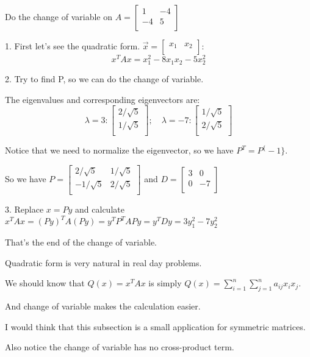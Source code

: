 \begin{eg}
    Do the change of variable on \(A = \begin{bmatrix}
        1 &  -4 \\
        -4 &  5 \\
    \end{bmatrix}\) 

    1. First let's see the quadratic form. \(\vec{x} = \begin{bmatrix}
        x_1 &  x_2 \\
    \end{bmatrix}\): 
    \[
        x^TAx = x_1^2 - 8x_1x_2 - 5x_2^2
    \]

    2. Try to find P, so we can do the change of variable.

    The eigenvalues and corresponding eigenvectors are:
    \[
        \lambda = 3: \begin{bmatrix}
             2/\sqrt{5} \\
             1/\sqrt{5} \\
        \end{bmatrix};
        \quad
        \lambda = -7: \begin{bmatrix}
             1/\sqrt{5} \\
             2/\sqrt{5} \\
        \end{bmatrix}
    \]

    \begin{remark}
    Notice that we need to normalize the eigenvector, so we have \(P^T = P^\{ -1 \} \).
    \end{remark}

    So we have \(P = \begin{bmatrix}
        2/\sqrt{5} &  1/\sqrt{5} \\
        -1/\sqrt{5} &  2/\sqrt{5} \\
    \end{bmatrix}\)
    and  \(D = \begin{bmatrix}
        3 &  0 \\
        0 &  -7 \\
    \end{bmatrix}\) 

    3. Replace \(x = Py\) and calculate \(x^TAx = (Py)^TA(Py) = y^TP^TAPy = y^TDy = 3y_1^2 - 7 y_2^2\)   

    That's the end of the change of variable.
\end{eg}

\begin{note}
    Quadratic form is very natural in real day problems. 

    We should know that \(Q(x) = x^TAx\)  is simply \(Q(x) = \sum_{i=1}^n \sum_{j=1}^n a_{ij}x_ix_j\). 

    And change of variable makes the calculation easier.

    I would think that this subsection is a small application for symmetric matrices.

    Also notice the change of variable has no cross-product term.
\end{note}

